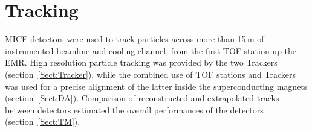 \section{Tracking}{
\label{Sect:Tracking}

MICE detectors were used to track particles across more than 15\,m of instrumented beamline and cooling channel, from the first TOF station up the EMR.
High resolution particle tracking was provided by the two Trackers (section~\ref{Sect:Tracker}), while the combined use of TOF stations and Trackers was used for a precise alignment of the latter inside the superconducting magnets (section~\ref{Sect:DA}).
Comparison of reconstructed and extrapolated tracks between detectors estimated the overall performances of the detectors (section~\ref{Sect:TM}).

  \let\section\subsection
  \let\subsection\subsubsection
  \let\subsubsection\paragraph

}
